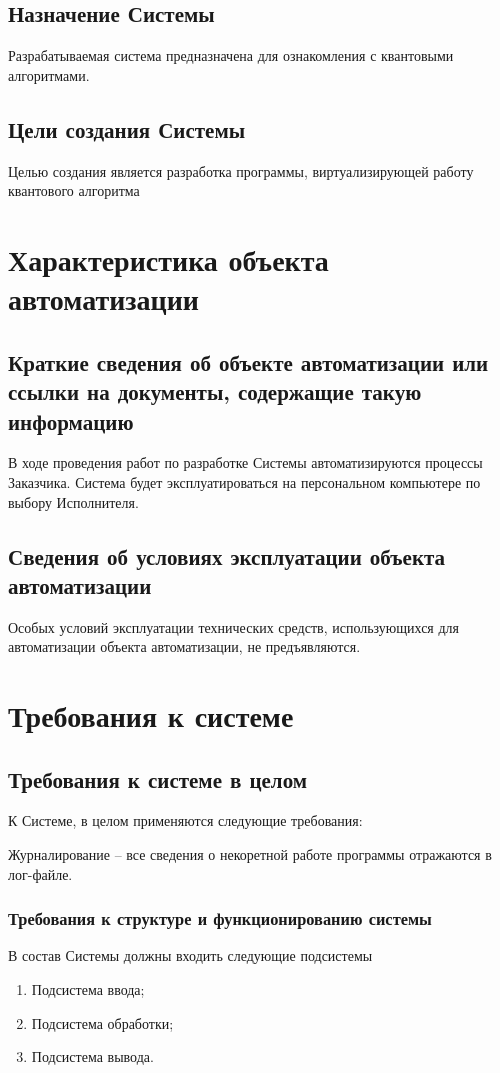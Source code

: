 \section{Назначение Системы}
Разрабатываемая система предназначена для ознакомления с квантовыми алгоритмами.

\section{Цели создания Системы}
Целью создания является разработка программы, виртуализирующей работу
квантового алгоритма

\chapter{Характеристика объекта автоматизации}
\section{Краткие сведения об объекте автоматизации или ссылки на документы,
содержащие такую информацию}
В ходе проведения работ по разработке Системы автоматизируются процессы
Заказчика. Система будет эксплуатироваться на персональном компьютере по
выбору Исполнителя.

\section{Сведения об условиях эксплуатации объекта автоматизации}
Особых условий эксплуатации технических средств, использующихся для
автоматизации объекта автоматизации, не предъявляются.

\chapter{Требования к системе}
\section{Требования к системе в целом}
К Системе, в целом применяются следующие требования:

Журналирование -- все сведения о некоретной работе программы отражаются
в лог-файле.

\subsection{Требования к структуре и функционированию системы}
В состав Системы должны входить следующие подсистемы
\begin{enumerate}
  \item Подсистема ввода;
  \item Подсистема обработки;
  \item Подсистема вывода.
\end{enumerate}

